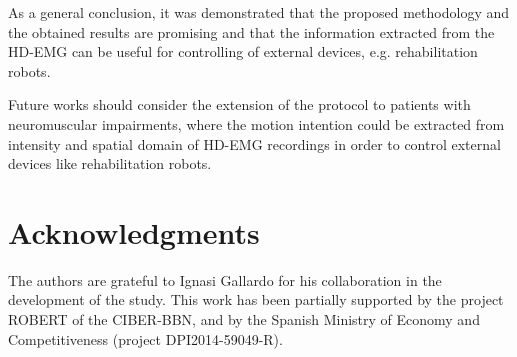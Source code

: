 As a general conclusion, it was demonstrated that the proposed methodology and the obtained results are promising and that the information extracted from the HD-EMG can be useful for controlling of external devices, e.g. rehabilitation robots.

Future works should consider the extension of the protocol to patients with neuromuscular impairments, where the motion intention could be extracted from intensity and spatial domain of HD-EMG recordings in order to control external devices like rehabilitation robots. 

\section{Acknowledgments}
The authors are grateful to Ignasi Gallardo for his collaboration in the development of the study.
This work has been partially supported by the project ROBERT of the CIBER-BBN, and by the Spanish Ministry of Economy and Competitiveness (project DPI2014-59049-R).

